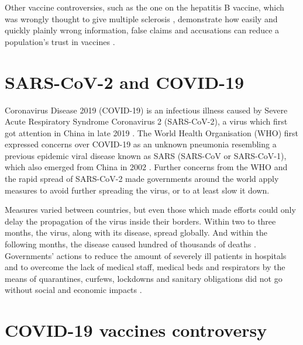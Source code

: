 Other vaccine controversies, such as the one on the hepatitis B vaccine, which was wrongly thought to give multiple sclerosis \cite{nauche_3043_2001, giacometti_derives_2001, favereau_mensonges_canal_plus_liberation_2001, bursaux_mensonges_le_monde_2001, royo_vaccin_2009}, demonstrate how easily and quickly plainly wrong information, false claims and accusations can reduce a population's trust in vaccines \cite{francois_vaccine_2005}.



\section{SARS-CoV-2 and COVID-19}
\label{sars-cov-2_covid-19}

Coronavirus Disease 2019 (COVID-19) is an infectious illness caused by Severe Acute Respiratory Syndrome Coronavirus 2 (SARS-CoV-2), a virus which first got attention in China in late 2019 \cite{who_origin_sars-cov-2_2020}. The World Health Organisation (WHO) first expressed concerns over COVID-19 as an unknown pneumonia resembling a previous epidemic viral disease known as SARS (SARS-CoV or SARS-CoV-1), which also emerged from China in 2002 \cite{who_sars_nodate, stadler_sars_2003, chan-yeung_sars_2003}. Further concerns from the WHO and the rapid spread of SARS-CoV-2 made governments around the world apply measures to avoid further spreading the virus, or to at least slow it down.

Measures varied between countries, but even those which made efforts could only delay the propagation of the virus inside their borders. Within two to three months, the virus, along with its disease, spread globally. And within the following months, the disease caused hundred of thousands of deaths \cite{who_dashboard_nodate}.
Governments' actions to reduce the amount of severely ill patients in hospitals and to overcome the lack of medical staff, medical beds and respirators by the means of quarantines, curfews, lockdowns and sanitary obligations did not go without social and economic impacts \cite{mofijur_impact_2021, brodeur_literature_2021}.



\section{COVID-19 vaccines controversy}

